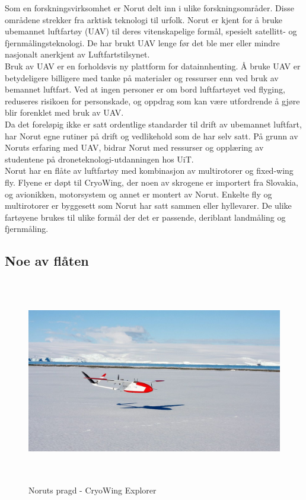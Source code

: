 \documentclass[12pt, a4paper]{article}
\begin{document}
Som en forskningsvirksomhet er Norut delt inn i ulike forskningsområder. Disse områdene strekker fra arktisk teknologi til urfolk.
Norut er kjent for å bruke ubemannet luftfartøy (UAV) til deres vitenskapelige formål, spesielt satellitt- og fjernmålingsteknologi.  De har brukt UAV lenge før det ble mer eller mindre nasjonalt anerkjent av Luftfartstilsynet.\\

Bruk av UAV er en forholdsvis ny plattform for datainnhenting. Å bruke UAV er betydeligere billigere med tanke på materialer og ressurser enn ved bruk av bemannet luftfart. Ved at ingen personer er om bord luftfartøyet ved flyging, reduseres risikoen for personskade, og oppdrag som kan være utfordrende å gjøre blir forenklet med bruk av UAV. \\

Da det foreløpig ikke er satt ordentlige standarder til drift av ubemannet luftfart, har Norut egne rutiner på drift og vedlikehold som de har selv satt. På grunn av Noruts erfaring med UAV, bidrar Norut med ressurser og opplæring av studentene på droneteknologi-utdanningen hos UiT. \\

Norut har en flåte av luftfartøy med kombinasjon av multirotorer og fixed-wing fly. Flyene er døpt til CryoWing, der noen av skrogene er importert fra Slovakia, og avionikken, motorsystem og annet er montert av Norut. Enkelte fly og multirotorer er byggesett som Norut har satt sammen eller hyllevarer. De ulike fartøyene brukes til ulike formål der det er passende, deriblant landmåling og fjernmåling.\\
\newpage

\subsection{Noe av flåten}
\begin{figure}[hpbt]
	\centering
	\includegraphics[width=.6\textwidth, height=9cm]{bilder/CryoWing_Explorer.jpeg}
	\caption[CryoWing Explorer]{Noruts pragd - CryoWing Explorer}
\end{figure}
\end{document}
